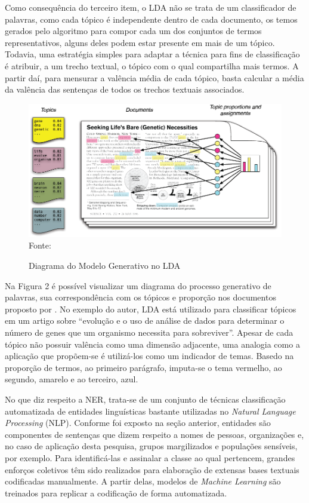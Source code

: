 \documentclass[
12pt,				%
openright,			%
twoside,			%
a4paper,			%
english,			%
french,				%
spanish,			%
brazil				%
]{abntex2}
\begin{document}
Como consequência do terceiro item, o LDA não se trata de um classificador de palavras, como cada tópico é independente dentro de cada documento, os temos gerados pelo algoritmo para compor cada um dos conjuntos de termos representativos, alguns deles podem estar presente em mais de um tópico. Todavia, uma estratégia simples para adaptar a técnica para fins de classificação é atribuir, a um trecho textual, o tópico com o qual compartilha mais termos. A partir daí, para mensurar a valência média de cada tópico, basta calcular a média da valência das sentenças de todos os trechos textuais associados.

\begin{figure}[h]
	\caption{Diagrama do Modelo Generativo no LDA}
	\label{fig:diagrama}
	\centering
	\includegraphics[width=1\linewidth]{figures/diagrama_lda}
	Fonte: 
\end{figure}

Na Figura 2 é possível visualizar um diagrama do processo generativo de palavras, sua correspondência com os tópicos e proporção nos documentos proposto por . No exemplo do autor, LDA está utilizado para classificar tópicos em um artigo sobre ``evolução e o uso de análise de dados para determinar o número de genes que um organismo necessita para sobreviver''. Apesar de cada tópico não possuir valência como uma dimensão adjacente, uma analogia como a aplicação que propõem-se é utilizá-los como um indicador de temas. Basedo na proporção de termos, ao primeiro parágrafo, imputa-se o tema vermelho, ao segundo, amarelo e ao terceiro, azul.   

No que diz respeito a NER, trata-se de um conjunto de técnicas classificação automatizada de entidades linguísticas bastante utilizadas no \emph{Natural Language Processing} (NLP). Conforme foi exposto na seção anterior, entidades são componentes de sentenças que dizem respeito a nomes de pessoas, organizações e, no caso de aplicação desta pesquisa, grupos margilizados e populações sensíveis, por exemplo. Para identificá-las e assinalar a classe ao qual pertencem, grandes enforços coletivos têm sido realizados para elaboração de extensas bases textuais codificadas manualmente. A partir delas, modelos de \emph{Machine Learning} são treinados para replicar a codificação de forma automatizada. 
\end{document}
